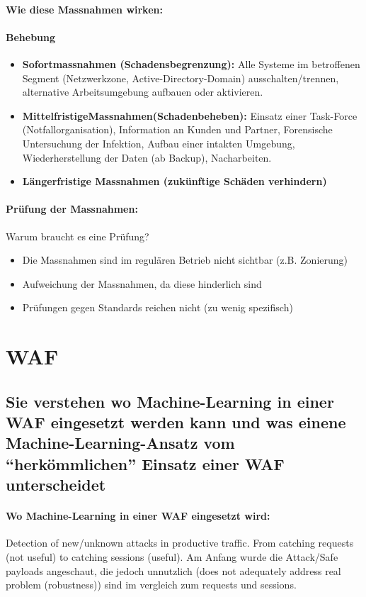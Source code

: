 \documentclass[10pt,a4paper]{article}
\begin{document}
\paragraph*{Wie diese Massnahmen wirken:}
\paragraph*{Behebung}
\begin{itemize}[noitemsep,topsep=0pt,leftmargin=*]
	\item \textbf{Sofortmassnahmen (Schadensbegrenzung):} Alle Systeme im betroffenen Segment (Netzwerkzone, Active-Directory-Domain) ausschalten/trennen, alternative Arbeitsumgebung aufbauen oder aktivieren.
	\item \textbf{MittelfristigeMassnahmen(Schadenbeheben):} Einsatz einer Task-Force (Notfallorganisation), Information an Kunden und Partner, Forensische Untersuchung der Infektion, Aufbau einer intakten Umgebung, Wiederherstellung der Daten (ab Backup), Nacharbeiten.
	\item \textbf{Längerfristige Massnahmen (zukünftige Schäden verhindern)}
\end{itemize}
\paragraph*{Prüfung der Massnahmen:} Warum braucht es eine Prüfung?
\begin{itemize}[noitemsep,topsep=0pt,leftmargin=*]
    \item Die Massnahmen sind im regulären Betrieb nicht sichtbar (z.B. Zonierung)
    \item Aufweichung der Massnahmen, da diese hinderlich sind
    \item Prüfungen gegen Standards reichen nicht (zu wenig spezifisch)
\end{itemize}

\section{WAF}
\subsection*{Sie verstehen wo Machine-Learning in einer WAF eingesetzt werden kann und was einene Machine-Learning-Ansatz vom "`herkömmlichen"' Einsatz einer WAF unterscheidet}
\paragraph*{Wo Machine-Learning in einer WAF eingesetzt wird:} Detection of new/unknown attacks in productive traffic. From catching requests (not useful) to catching sessions (useful). Am Anfang wurde die Attack/Safe payloads angeschaut, die jedoch unnutzlich (does not adequately address real problem (robustness)) sind im vergleich zum requests und sessions.
\end{document}
